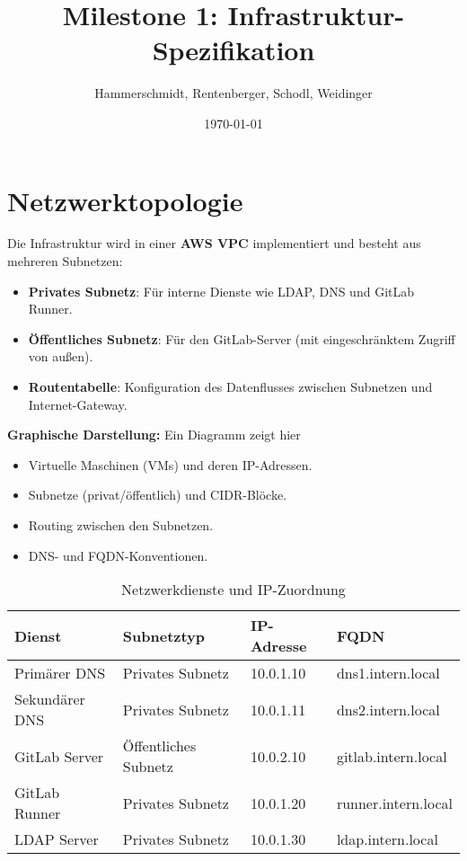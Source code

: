 \documentclass[a4paper,12pt]{article}
\title{Milestone 1: Infrastruktur-Spezifikation}
\author{Hammerschmidt, Rentenberger, Schodl, Weidinger}
\date{\today}
\begin{document}
\maketitle
\tableofcontents
\newpage

\section{Netzwerktopologie}
Die Infrastruktur wird in einer \textbf{AWS VPC} implementiert und besteht aus mehreren Subnetzen:
\begin{itemize}
    \item \textbf{Privates Subnetz}: Für interne Dienste wie LDAP, DNS und GitLab Runner.
    \item \textbf{Öffentliches Subnetz}: Für den GitLab-Server (mit eingeschränktem Zugriff von außen).
    \item \textbf{Routentabelle}: Konfiguration des Datenflusses zwischen Subnetzen und Internet-Gateway.
\end{itemize}

\textbf{Graphische Darstellung:} Ein Diagramm zeigt hier
\begin{itemize}
    \item Virtuelle Maschinen (VMs) und deren IP-Adressen.
    \item Subnetze (privat/öffentlich) und CIDR-Blöcke.
    \item Routing zwischen den Subnetzen.
    \item DNS- und FQDN-Konventionen.
\end{itemize}

\begin{table}[h!]
    \centering
    \begin{tabular}{|l|l|l|l|}
    \hline
    \textbf{Dienst}          & \textbf{Subnetztyp}      & \textbf{IP-Adresse} & \textbf{FQDN}             \\ \hline
    Primärer DNS             & Privates Subnetz         & 10.0.1.10           & dns1.intern.local         \\ \hline
    Sekundärer DNS           & Privates Subnetz         & 10.0.1.11           & dns2.intern.local         \\ \hline
    GitLab Server            & Öffentliches Subnetz     & 10.0.2.10           & gitlab.intern.local       \\ \hline
    GitLab Runner            & Privates Subnetz         & 10.0.1.20           & runner.intern.local       \\ \hline
    LDAP Server              & Privates Subnetz         & 10.0.1.30           & ldap.intern.local         \\ \hline
    \end{tabular}
    \caption{Netzwerkdienste und IP-Zuordnung}
\end{table}
\end{document}
